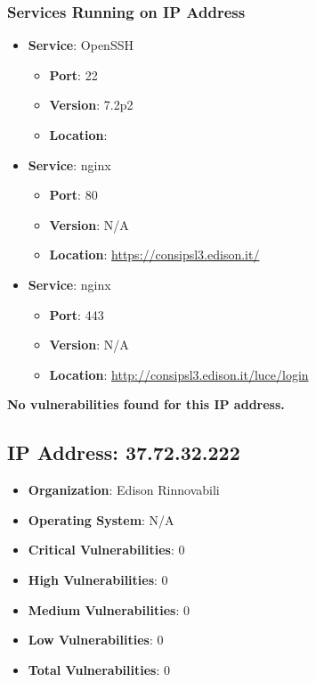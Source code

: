 \documentclass{article}
\begin{document}
\subsubsection*{Services Running on IP Address}

\begin{itemize}
    
        \item \textbf{Service}: OpenSSH
        \begin{itemize}
            \item \textbf{Port}: 22
            \item \textbf{Version}:  7.2p2 
            \item \textbf{Location}: \href{  }{  }
        \end{itemize}
    
        \item \textbf{Service}: nginx
        \begin{itemize}
            \item \textbf{Port}: 80
            \item \textbf{Version}:  N/A 
            \item \textbf{Location}: \href{ https://consipsl3.edison.it/ }{ https://consipsl3.edison.it/ }
        \end{itemize}
    
        \item \textbf{Service}: nginx
        \begin{itemize}
            \item \textbf{Port}: 443
            \item \textbf{Version}:  N/A 
            \item \textbf{Location}: \href{ http://consipsl3.edison.it/luce/login }{ http://consipsl3.edison.it/luce/login }
        \end{itemize}
    
\end{itemize}


\textbf{No vulnerabilities found for this IP address.}




\clearpage



\subsection{IP Address: 37.72.32.222}

\begin{itemize}
    \item \textbf{Organization}: Edison Rinnovabili
    \item \textbf{Operating System}:  N/A 
    \item \textbf{Critical Vulnerabilities}: 0
    \item \textbf{High Vulnerabilities}: 0
    \item \textbf{Medium Vulnerabilities}: 0
    \item \textbf{Low Vulnerabilities}: 0
    \item \textbf{Total Vulnerabilities}: 0
\end{itemize}
\end{document}
